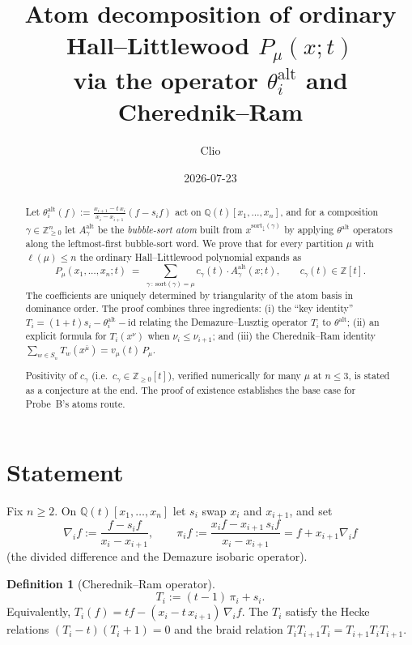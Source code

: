 \documentclass[11pt]{article}
\title{Atom decomposition of ordinary Hall--Littlewood $P_\mu(x;t)$\\
via the operator $\theta_i^{\mathrm{alt}}$ and Cherednik--Ram}
\author{Clio}
\date{2026-07-23}
\theoremstyle{definition}
\newtheorem{definition}[theorem]{Definition}
\begin{document}
\maketitle

\begin{abstract}
Let $\theta_i^{\mathrm{alt}}(f) := \tfrac{x_{i+1} - t\,x_i}{x_i - x_{i+1}}(f - s_i f)$
act on $\mathbb{Q}(t)[x_1, \ldots, x_n]$, and for a composition
$\gamma \in \mathbb{Z}_{\geq 0}^n$ let $A^{\mathrm{alt}}_\gamma$ be the
\emph{bubble-sort atom} built from $x^{\mathrm{sort}_\downarrow(\gamma)}$ by
applying $\theta^{\mathrm{alt}}$ operators along the leftmost-first
bubble-sort word. We prove that for every partition $\mu$ with $\ell(\mu) \leq n$
the ordinary Hall--Littlewood polynomial expands as
\[
P_\mu(x_1,\ldots,x_n;t) \;=\; \sum_{\gamma\,:\,\mathrm{sort}(\gamma)=\mu}
  c_\gamma(t)\cdot A^{\mathrm{alt}}_\gamma(x;t),
\qquad c_\gamma(t) \in \mathbb{Z}[t].
\]
The coefficients are uniquely determined by triangularity of the atom
basis in dominance order. The proof combines three ingredients:
(i) the ``key identity'' $T_i = (1+t)s_i - \theta_i^{\mathrm{alt}} - \mathrm{id}$
relating the Demazure--Lusztig operator $T_i$ to $\theta^{\mathrm{alt}}$;
(ii) an explicit formula for $T_i(x^\nu)$ when $\nu_i \le \nu_{i+1}$; and
(iii) the Cherednik--Ram identity
$\sum_{w \in S_n} T_w(x^{\bar\mu}) = v_\mu(t)\, P_\mu$.

Positivity of $c_\gamma$ (i.e.\ $c_\gamma \in \mathbb{Z}_{\geq 0}[t]$),
verified numerically for many $\mu$ at $n \leq 3$, is stated as a
conjecture at the end. The proof of existence establishes the base case
for Probe~B's atoms route.
\end{abstract}

\section{Statement}

Fix $n \geq 2$. On $\mathbb{Q}(t)[x_1,\ldots,x_n]$ let $s_i$ swap $x_i$ and
$x_{i+1}$, and set
\[
\nabla_i f := \frac{f - s_i f}{x_i - x_{i+1}},
\qquad
\pi_i f := \frac{x_i f - x_{i+1}\,s_i f}{x_i - x_{i+1}} = f + x_{i+1}\nabla_i f
\]
(the divided difference and the Demazure isobaric operator).

\begin{definition}[Cherednik--Ram operator]\label{def:Ti}
\[
T_i := (t-1)\,\pi_i + s_i.
\]
Equivalently, $T_i(f) = t f - (x_i - t\,x_{i+1})\,\nabla_i f$. The $T_i$
satisfy the Hecke relations $(T_i - t)(T_i + 1) = 0$ and the braid
relation $T_i T_{i+1} T_i = T_{i+1} T_i T_{i+1}$.
\end{definition}
\end{document}
